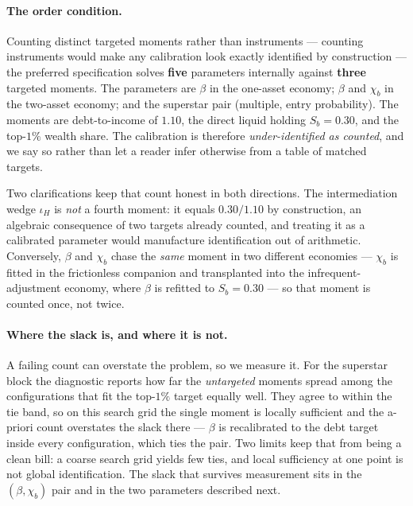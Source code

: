 \documentclass[12pt]{article}
\begin{document}
\paragraph{The order condition.} Counting distinct targeted moments rather
than instruments --- counting instruments would make any calibration look
exactly identified by construction --- the preferred specification solves
\textbf{five} parameters internally against \textbf{three} targeted moments.
The parameters are $\beta$ in the one-asset economy; $\beta$ and $\chi_b$ in
the two-asset economy; and the superstar pair (multiple, entry probability).
The moments are debt-to-income of $1.10$, the direct liquid holding
$S_b=0.30$, and the top-$1\%$ wealth share. The calibration is therefore
\emph{under-identified as counted}, and we say so rather than let a reader
infer otherwise from a table of matched targets.

Two clarifications keep that count honest in both directions. The
intermediation wedge $\iota_H$ is \emph{not} a fourth moment: it equals
$0.30/1.10$ by construction, an algebraic consequence of two targets already
counted, and treating it as a calibrated parameter would manufacture
identification out of arithmetic. Conversely, $\beta$ and $\chi_b$ chase the
\emph{same} moment in two different economies --- $\chi_b$ is fitted in the
frictionless companion and transplanted into the infrequent-adjustment
economy, where $\beta$ is refitted to $S_b=0.30$ --- so that moment is
counted once, not twice.

\paragraph{Where the slack is, and where it is not.} A failing count can
overstate the problem, so we measure it. For the superstar block the
diagnostic reports how far the \emph{untargeted} moments spread among the
configurations that fit the top-$1\%$ target equally well. They agree to
within the tie band, so on this search grid the single moment is locally
sufficient and the a-priori count overstates the slack there --- $\beta$ is
recalibrated to the debt target inside every configuration, which ties the
pair. Two limits keep that from being a clean bill: a coarse search grid
yields few ties, and local sufficiency at one point is not global
identification. The slack that survives measurement sits in the
$(\beta,\chi_b)$ pair and in the two parameters described next.
\end{document}
